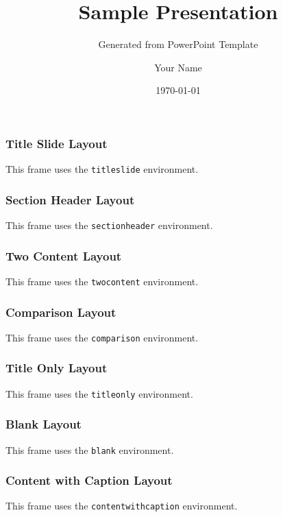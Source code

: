 \documentclass[11pt,aspectratio=169]{beamer}
\title{Sample Presentation}
\subtitle{Generated from PowerPoint Template}
\author{Your Name}
\institute{Your Institution}
\date{\today}
\begin{document}
\begin{titleslide}
  \begin{frame}
    \frametitle{Title Slide Layout}
    This frame uses the \texttt{titleslide} environment.
  \end{frame}
\end{titleslide}

\begin{sectionheader}
  \begin{frame}
    \frametitle{Section Header Layout}
    This frame uses the \texttt{sectionheader} environment.
  \end{frame}
\end{sectionheader}

\begin{twocontent}
  \begin{frame}
    \frametitle{Two Content Layout}
    This frame uses the \texttt{twocontent} environment.
  \end{frame}
\end{twocontent}

\begin{comparison}
  \begin{frame}
    \frametitle{Comparison Layout}
    This frame uses the \texttt{comparison} environment.
  \end{frame}
\end{comparison}

\begin{titleonly}
  \begin{frame}
    \frametitle{Title Only Layout}
    This frame uses the \texttt{titleonly} environment.
  \end{frame}
\end{titleonly}

\begin{blank}
  \begin{frame}
    \frametitle{Blank Layout}
    This frame uses the \texttt{blank} environment.
  \end{frame}
\end{blank}

\begin{contentwithcaption}
  \begin{frame}
    \frametitle{Content with Caption Layout}
    This frame uses the \texttt{contentwithcaption} environment.
  \end{frame}
\end{contentwithcaption}
\end{document}
